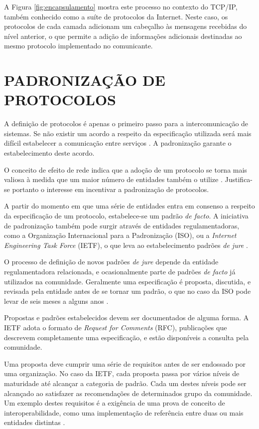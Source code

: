 A Figura \ref{fig:encapsulamento} mostra este processo no contexto do TCP/IP, também
conhecido como a suíte de protocolos da Internet. Neste caso, os protocolos de cada
camada adicionam um cabeçalho às mensagens recebidas do nível anterior, o que
permite a adição de informações adicionais destinadas ao mesmo protocolo
implementado no comunicante.



\section{PADRONIZAÇÃO DE PROTOCOLOS}

A definição de protocolos é apenas o primeiro passo para a intercomunicação de
sistemas. Se não existir um acordo a respeito da especificação utilizada será mais
difícil estabelecer a comunicação entre serviços \cite{kurose2012}. A padronização
garante o estabelecimento deste acordo.

\begin{sloppypar}
O conceito de efeito de rede indica que a adoção de um protocolo se torna mais
valiosa à medida que um maior número de entidades também o utilize
\cite{liebowitz1998}. Justifica-se portanto o interesse em incentivar a padronização
de protocolos.
\end{sloppypar}

A partir do momento em que uma série de entidades entra em consenso a respeito da
especificação de um protocolo, estabelece-se um padrão \textit{de facto}. A
iniciativa de padronização também pode surgir através de entidades regulamentadoras,
como a Organização Internacional para a Padronização (ISO), ou a \textit{Internet
Engineering Task Force} (IETF), o que leva ao estabelecimento padrões \textit{de
jure} \cite{tanenbaum2010}.

O processo de definição de novos padrões \textit{de jure} depende da entidade
regulamentadora relacionada, e ocasionalmente parte de padrões \textit{de facto} já
utilizados na comunidade. Geralmente uma especificação é proposta, discutida, e
revisada pela entidade antes de se tornar um padrão, o que no caso da ISO pode levar
de seis meses a alguns anos \cite{tanenbaum2010}.

Propostas e padrões estabelecidos devem ser documentados de alguma forma. A IETF
adota o formato de \textit{Request for Comments} (RFC), publicações que descrevem
completamente uma especificação, e estão disponíveis a consulta pela comunidade.

Uma proposta deve cumprir uma série de requisitos antes de ser endossado por uma
organização. No caso da IETF, cada proposta passa por vários níveis de maturidade
até alcançar a categoria de padrão. Cada um destes níveis pode ser alcançado ao
satisfazer as recomendações de determinados grupo da comunidade. Um exemplo destes
requisitos é a exigência de uma prova de conceito de interoperabilidade, como uma
implementação de referência entre duas ou mais entidades distintas \cite{rfc1280}.

